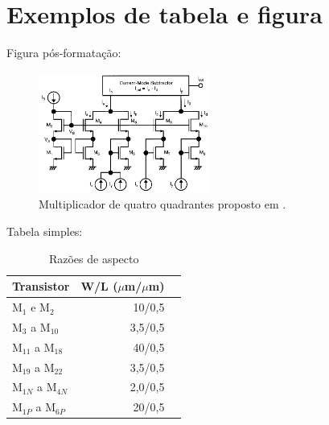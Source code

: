 \chapter*{Exemplos de tabela e figura}

 Figura pós-formata\c{c}\~ao:
\begin{figure}[H]
    \centering
    \includegraphics[width=0.5\textwidth]{figures/tanno_multiplier.png}
    \caption{\small Multiplicador de quatro quadrantes proposto em \cite{einstein1905}.\normalsize}
    \label{fig_tanno}
\end{figure}

Tabela simples:
\begin{table}[h]
    \centering
    \caption{Razões de aspecto}
    \label{tab_aspectos}
    \begin{tabular}{|l|r|r|}
    \hline
    Transistor                    & W/L ($\mu$m/$\mu$m) \\ \hline
    M$_1$ e M$_2$                 & 10/0,5              \\ \hline
    M$_3$ a M$_{10}$              & 3,5/0,5             \\ \hline
    M$_{11}$ a M$_{18}$           & 40/0,5              \\ \hline
    M$_{19}$ a M$_{22}$           & 3,5/0,5             \\ \hline
    M$_{1N}$ a M$_{4N}$           & 2,0/0,5             \\ \hline
    M$_{1P}$ a M$_{6P}$           & 20/0,5              \\ \hline
    \end{tabular}
\end{table}

\lipsum[1-25]